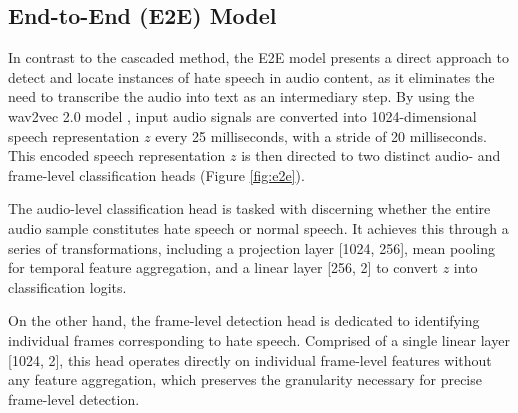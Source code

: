 \documentclass[11pt]{article}
\begin{document}
\subsection{End-to-End (E2E) Model}
\label{sec:e2e}
In contrast to the cascaded method, the E2E model presents a direct approach to detect and locate instances of hate speech in audio content, as it eliminates the need to transcribe the audio into text as an intermediary step. By using the wav2vec 2.0 model \cite{w2v}, input audio signals are converted into 1024-dimensional speech representation $z$ every 25 milliseconds, with a stride of 20 milliseconds. This encoded speech representation $z$ is then directed to two distinct audio- and frame-level classification heads (Figure \ref{fig:e2e}).

The audio-level classification head is tasked with discerning whether the entire audio sample constitutes hate speech or normal speech. It achieves this through a series of transformations, including a projection layer [1024, 256], mean pooling for temporal feature aggregation, and a linear layer [256, 2] to convert $z$ into classification logits. 







On the other hand, the frame-level detection head is dedicated to identifying individual frames corresponding to hate speech. Comprised of a single linear layer [1024, 2], this head operates directly on individual frame-level features without any feature aggregation, which preserves the granularity necessary for precise frame-level detection. 
\end{document}
